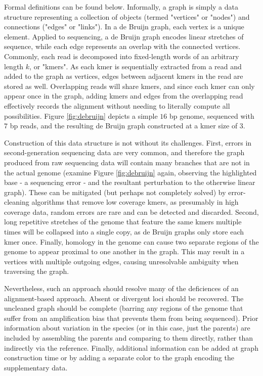 Formal definitions can be found below.  Informally, a graph is simply a data structure representing a collection of objects (termed "vertices" or "nodes") and connections ("edges" or "links").  In a de Bruijn graph, each vertex is a unique element.  Applied to sequencing, a de Bruijn graph encodes linear stretches of sequence, while each edge represents an overlap with the connected vertices.  Commonly, each read is decomposed into fixed-length words of an arbitrary length $k$, or "kmers".  As each kmer is sequentially extracted from a read and added to the graph as vertices, edges between adjacent kmers in the read are stored as well.  Overlapping reads will share kmers, and since each kmer can only appear once in the graph, adding kmers and edges from the overlapping read effectively records the alignment without needing to literally compute all possibilities.  Figure \ref{fig:debruijn} depicts a simple $16$ bp genome, sequenced with $7$ bp reads, and the resulting de Bruijn graph constructed at a kmer size of $3$.

Construction of this data structure is not without its challenges.  First, errors in second-generation sequencing data are very common, and therefore the graph produced from raw sequencing data will contain many branches that are not in the actual genome (examine Figure \ref{fig:debruijn} again, observing the highlighted base - a sequencing error - and the resultant perturbation to the otherwise linear graph).  These can be mitigated (but perhaps not completely solved) by error-cleaning algorithms that remove low coverage kmers, as presumably in high coverage data, random errors are rare and can be detected and discarded.  Second, long repetitive stretches of the genome that feature the same kmers multiple times will be collapsed into a single copy, as de Bruijn graphs only store each kmer once.  Finally, homology in the genome can cause two separate regions of the genome to appear proximal to one another in the graph.  This may result in a vertices with multiple outgoing edges, causing unresolvable ambiguity when traversing the graph.

Nevertheless, such an approach should resolve many of the deficiences of an alignment-based approach.  Absent or divergent loci should be recovered.  The uncleaned graph should be complete (barring any regions of the genome that suffer from an amplification bias that prevents them from being sequenced).  Prior information about variation in the species (or in this case, just the parents) are included by assembling the parents and comparing to them directly, rather than indirectly via the reference.  Finally, additional information can be added at graph construction time or by adding a separate color to the graph encoding the supplementary data.

